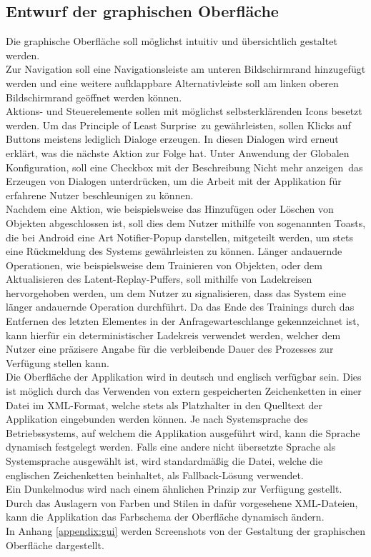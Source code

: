 \documentclass[oneside]{ausarbeitung}
\begin{document}
\subsection{Entwurf der graphischen Oberfläche}
Die graphische Oberfläche soll möglichst intuitiv und übersichtlich gestaltet werden.\\
Zur Navigation soll eine Navigationsleiste am unteren Bildschirmrand hinzugefügt werden und eine weitere aufklappbare Alternativleiste soll am linken oberen Bildschirmrand geöffnet werden können.\\
Aktions- und Steuerelemente sollen mit möglichst selbsterklärenden Icons besetzt werden. Um das \glqq Principle of Least Surprise\grqq\ zu gewährleisten, sollen Klicks auf Buttons meistens lediglich Dialoge erzeugen. In diesen Dialogen wird erneut erklärt, was die nächste Aktion zur Folge hat. Unter Anwendung der Globalen Konfiguration, soll eine Checkbox mit der Beschreibung \glqq Nicht mehr anzeigen\grqq\ das Erzeugen von Dialogen unterdrücken, um die Arbeit mit der Applikation für erfahrene Nutzer beschleunigen zu können.\\
Nachdem eine Aktion, wie beispielsweise das Hinzufügen oder Löschen von Objekten abgeschlossen ist, soll dies dem Nutzer mithilfe von sogenannten Toasts, die bei Android eine Art Notifier-Popup darstellen, mitgeteilt werden, um stets eine Rückmeldung des Systems gewährleisten zu können. Länger andauernde Operationen, wie beispielsweise dem Trainieren von Objekten, oder dem Aktualisieren des Latent-Replay-Puffers, soll mithilfe von Ladekreisen hervorgehoben werden, um dem Nutzer zu signalisieren, dass das System eine länger andauernde Operation durchführt. Da das Ende des Trainings durch das Entfernen des letzten Elementes in der Anfragewarteschlange gekennzeichnet ist, kann hierfür ein deterministischer Ladekreis verwendet werden, welcher dem Nutzer eine präzisere Angabe für die verbleibende Dauer des Prozesses zur Verfügung stellen kann.\\
Die Oberfläche der Applikation wird in deutsch und englisch verfügbar sein. Dies ist möglich durch das Verwenden von extern gespeicherten Zeichenketten in einer Datei im XML-Format, welche stets als Platzhalter in den Quelltext der Applikation eingebunden werden können. Je nach Systemsprache des Betriebssystems, auf welchem die Applikation ausgeführt wird, kann die Sprache dynamisch festgelegt werden. Falls eine andere nicht übersetzte Sprache als Systemsprache ausgewählt ist, wird standardmäßig die Datei, welche die englischen Zeichenketten beinhaltet, als Fallback-Lösung verwendet.\\
Ein Dunkelmodus wird nach einem ähnlichen Prinzip zur Verfügung gestellt. Durch das Auslagern von Farben und Stilen in dafür vorgesehene XML-Dateien, kann die Applikation das Farbschema der Oberfläche dynamisch ändern.\\
In Anhang \ref{appendix:gui} werden Screenshots von der Gestaltung der graphischen Oberfläche dargestellt.
\end{document}
